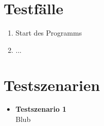
\section{Testfälle}
	\begin{enumerate}[align=left, leftmargin=4em, label={\textbf{\textbackslash T10\arabic*0\textbackslash}} ]
		\item Start des Programms
		\item ...
	\end{enumerate}

\section{Testszenarien}
	\begin{itemize}
		\item \textbf{Testszenario 1}\\
		Blub
	\end{itemize}
